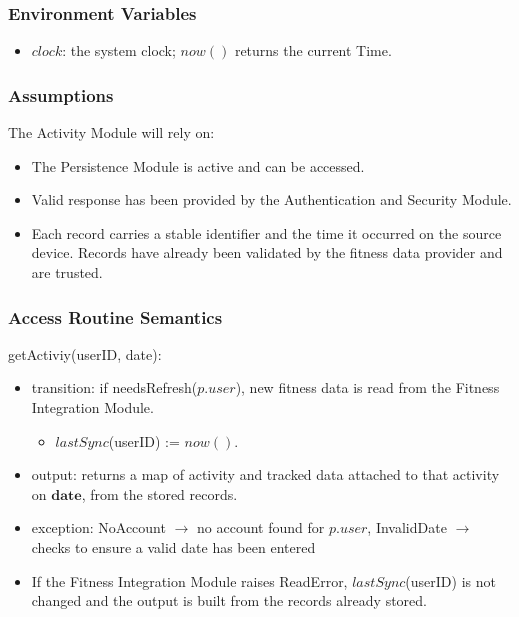 \documentclass[12pt, titlepage]{article}
\begin{document}
\subsubsection{Environment Variables}
\begin{itemize}
    \item $\mathit{clock}$: the system clock; $\mathit{now}()$ returns the current Time.
\end{itemize}

\subsubsection{Assumptions}
The Activity Module will rely on:
\begin{itemize}
    \item The Persistence Module is active and can be accessed.
    \item Valid response has been provided by the Authentication and Security Module.
    \item Each record carries a stable identifier and the time it occurred on the source device. Records have already been validated by the fitness data provider and are trusted.
\end{itemize}

\subsubsection{Access Routine Semantics}

\noindent getActiviy(userID, date):
\begin{itemize}
\item transition: if needsRefresh($p.\mathit{user}$), new fitness data is read from the Fitness Integration Module.
  \begin{itemize}
    \item $\mathit{lastSync}$(userID) := $\mathit{now}()$.
  \end{itemize}
\item output: returns a map of activity and tracked data attached to that activity on $\mathbf{date}$, from the stored records.
\item exception: NoAccount $\longrightarrow$ no account found for $p.\mathit{user}$, InvalidDate $\longrightarrow$ checks to ensure a valid date has been entered
\item If the Fitness Integration Module raises ReadError, $\mathit{lastSync}$(userID) is not changed and the output is built from the records already stored.
\end{itemize}
\end{document}

